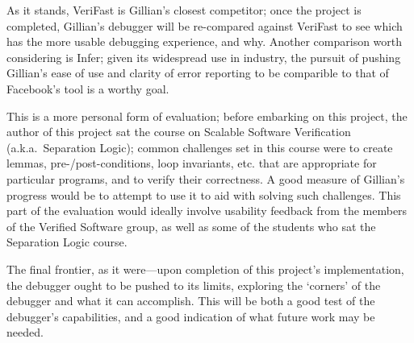 As it stands, VeriFast is Gillian's closest competitor; once the project is
completed, Gillian's debugger will be re-compared against VeriFast to see which
has the more usable debugging experience, and why. Another comparison worth
considering is Infer; given its widespread use in industry, the pursuit of
pushing Gillian's ease of use and clarity of error reporting to be comparible
to that of Facebook's tool is a worthy goal.

This is a more personal form of evaluation; before embarking on this project,
the author of this project sat the course on Scalable Software Verification (a.k.a.~Separation Logic); common challenges set in this course were to create lemmas,
pre-/post-conditions, loop invariants, etc. that are appropriate for particular
programs, and to verify their correctness. A good measure of Gillian's progress
would be to attempt to use it to aid with solving such challenges. 
This part of the evaluation would ideally involve usability feedback from the members of the Verified Software group, as well as some of the students who sat the Separation Logic course.

The final frontier, as it were---upon completion of this project's
implementation, the debugger ought to be pushed to its limits, exploring the
`corners' of the debugger and what it can accomplish. This will be both a good
test of the debugger's capabilities, and a good indication of what future work
may be needed.

